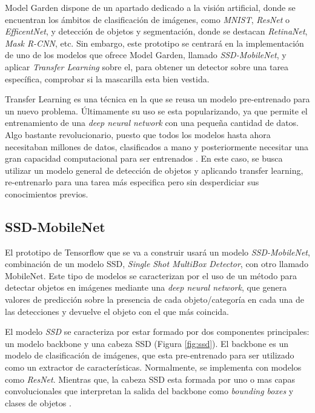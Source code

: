 Model Garden dispone de un apartado dedicado a la visión artificial, donde se encuentran los ámbitos de clasificación de imágenes, como \textit{MNIST}, \textit{ResNet} o \textit{EfficentNet}, y detección de objetos y segmentación, donde se destacan \textit{RetinaNet}, \textit{Mask R-CNN}, etc. Sin embargo, este prototipo se centrará en la implementación de uno de los modelos que ofrece Model Garden, llamado \textit{SSD-MobileNet}, y aplicar \textit{Transfer Learning} sobre el, para obtener un detector sobre una tarea específica, comprobar si la mascarilla esta bien vestida.

Transfer Learning es una técnica en la que se reusa un modelo pre-entrenado para un nuevo problema. Últimamente su uso se esta popularizando, ya que permite el entrenamiento de una \textit{deep neural network} con una pequeña cantidad de datos. Algo bastante revolucionario, puesto que todos los modelos hasta ahora necesitaban millones de datos, clasificados a mano y posteriormente necesitar una gran capacidad computacional para ser entrenados \cite{transferLearning}. En este caso, se busca utilizar un modelo general de detección de objetos y aplicando transfer learning, re-entrenarlo para una tarea más especifica pero sin desperdiciar sus conocimientos previos.

\subsection*{SSD-MobileNet}

El prototipo de Tensorflow que se va a construir usará un modelo \textit{SSD-MobileNet}, combinación de un modelo SSD, \textit{Single Shot MultiBox Detector}, con otro llamado MobileNet. Este tipo de modelos se caracterizan por el uso de un método para detectar objetos en imágenes mediante una \textit{deep neural network}, que genera valores de predicción sobre la presencia de cada objeto/categoría en cada una de las detecciones y devuelve el objeto con el que más coincida.

El modelo \textit{SSD} se caracteriza por estar formado por dos componentes principales: un modelo backbone y una cabeza SSD (Figura \ref{fig:ssd}). El backbone es un modelo de clasificación de imágenes, que esta pre-entrenado para ser utilizado como un extractor de características. Normalmente, se implementa con modelos como \textit{ResNet}. Mientras que, la cabeza SSD esta formada por uno o mas capas convolucionales que interpretan la salida del backbone como \textit{bounding boxes} y clases de objetos \cite{ssdwork}. 

